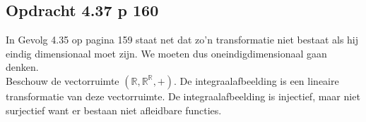 \documentclass[lineaire_algebra_oplossingen.tex]{subfiles}
\begin{document}
\subsection{Opdracht 4.37 p 160}
\label{4.37}
In Gevolg 4.35 op pagina 159 staat net dat zo'n transformatie niet bestaat als hij eindig dimensionaal moet zijn. We moeten dus oneindigdimensionaal gaan denken.\\
Beschouw de vectorruimte $(\mathbb{R},\mathbb{R}^\mathbb{R},+)$. De integraalafbeelding is een lineaire transformatie van deze vectorruimte. De integraalafbeelding is injectief, maar niet surjectief want er bestaan niet afleidbare functies.
\end{document}
